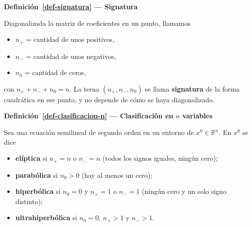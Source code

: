 \documentclass[
  spanish,
  a4paper,
]{scrbook}
\providecommand{\tightlist}{%
  \setlength{\itemsep}{0pt}\setlength{\parskip}{0pt}}
\theoremstyle{definition}
\theoremstyle{plain}
\theoremstyle{definition}
\theoremstyle{plain}
\theoremstyle{definition}
\theoremstyle{remark}
\begin{document}
\begin{tcolorbox}[enhanced jigsaw, arc=.35mm, bottomrule=.15mm, breakable, colback=white, colframe=quarto-callout-note-color-frame, left=2mm, leftrule=.75mm, opacityback=0, rightrule=.15mm, toprule=.15mm]
\begin{minipage}[t]{5.5mm}
\textcolor{quarto-callout-note-color}{\faInfo}
\end{minipage}%
\begin{minipage}[t]{\textwidth - 5.5mm}

\vspace{-3mm}\textbf{Definición~\ref{def-signatura} --- Signatura}\vspace{3mm}

Diagonalizada la matriz de coeficientes en un punto, llamamos

\begin{itemize}
\tightlist
\item
  \(n_+\) = cantidad de unos positivos,
\item
  \(n_-\) = cantidad de unos negativos,
\item
  \(n_0\) = cantidad de ceros,
\end{itemize}

con \(n_+ + n_- + n_0 = n\). La terna \((n_+, n_-, n_0)\) se llama
\textbf{signatura} de la forma cuadrática en ese punto, y no depende de
cómo se haya diagonalizado.

\end{minipage}%
\end{tcolorbox}

\begin{tcolorbox}[enhanced jigsaw, arc=.35mm, bottomrule=.15mm, breakable, colback=white, colframe=quarto-callout-note-color-frame, left=2mm, leftrule=.75mm, opacityback=0, rightrule=.15mm, toprule=.15mm]
\begin{minipage}[t]{5.5mm}
\textcolor{quarto-callout-note-color}{\faInfo}
\end{minipage}%
\begin{minipage}[t]{\textwidth - 5.5mm}

\vspace{-3mm}\textbf{Definición~\ref{def-clasificacion-n} --- Clasificación en \(n\)
variables}\vspace{3mm}

Sea una ecuación semilineal de segundo orden en un entorno de
\(x^0 \in \mathbb{R}^n\). En \(x^0\) se dice

\begin{itemize}
\tightlist
\item
  \textbf{elíptica} si \(n_+ = n\) o \(n_- = n\) (todos los signos
  iguales, ningún cero);
\item
  \textbf{parabólica} si \(n_0 > 0\) (hay al menos un cero);
\item
  \textbf{hiperbólica} si \(n_0 = 0\) y \(n_+ = 1\) o \(n_- = 1\)
  (ningún cero y un solo signo distinto);
\item
  \textbf{ultrahiperbólica} si \(n_0 = 0\), \(n_+ > 1\) y \(n_- > 1\).
\end{itemize}

\end{minipage}%
\end{tcolorbox}
\end{document}
